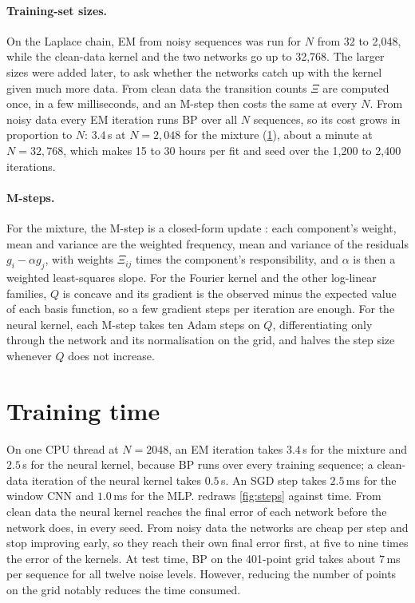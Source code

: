 \paragraph{Training-set sizes.} On the Laplace chain, EM from noisy sequences was run for $N$ from 32 to 2{,}048, while
the clean-data kernel and the two networks go up to 32{,}768. The larger sizes were added later, to ask whether the
networks catch up with the kernel given much more data. From clean data
the transition counts $\Xi$ are computed once, in a few milliseconds, and an M-step then costs the same at every $N$.
From noisy data every EM iteration runs BP over all $N$ sequences, so its cost grows in proportion to $N$: $3.4$\,s at
$N=2{,}048$ for the mixture (\cref{app:compute}), about a minute at $N=32{,}768$, which makes 15 to 30 hours per fit and
seed over the 1{,}200 to 2{,}400 iterations. 

\paragraph{M-steps.} For the mixture, the M-step is a closed-form update \cite{meng1993maximum}: each component's weight,
mean and variance are the weighted frequency, mean and variance of the residuals $g_i-\alpha g_j$, with weights $\Xi_{ij}$
times the component's responsibility, and $\alpha$ is then a weighted least-squares slope. For the Fourier kernel and
the other log-linear families, $Q$ is concave and its gradient is the observed minus the expected value of each basis
function, so a few gradient steps per iteration are enough. For the neural kernel, each M-step takes ten Adam steps on
$Q$, differentiating only through the network and its normalisation on the grid, and halves the step size whenever $Q$
does not increase.

\section{Training time}
\label{app:compute}

On one CPU thread at $N=2048$, an EM iteration takes $3.4$\,s for the mixture and $2.5$\,s for the neural kernel,
because BP runs over every training sequence; a clean-data iteration of the neural kernel takes $0.5$\,s. An SGD step
takes $2.5$\,ms for the window CNN and $1.0$\,ms for the MLP.  redraws \cref{fig:steps} against time.
From clean data the neural kernel reaches the final error of each network before the network does, in every seed. From
noisy data the networks are cheap per step and stop improving early, so they reach their own final error first, at five
to nine times the error of the kernels. At test time, BP on the 401-point grid takes about $7$\,ms per sequence for all
twelve noise levels. However, reducing the number of points on the grid notably reduces the time consumed.

